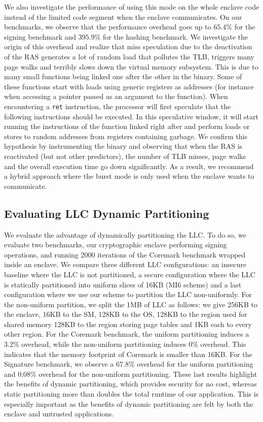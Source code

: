 We also investigate the performance of using this mode on the whole enclave code instead of the limited code segment when the enclave communicates.
On our benchmarks, we observe that the performance overhead goes up to $65.4\%$ for the signing benchmark and $395.9\%$ for the hashing benchmark. 
We investigate the origin of this overhead and realize that miss speculation due to the deactivation of the RAS generates a lot of random load that pollutes the TLB, triggers many page walks and terribly slows down the virtual memory subsystem.
This is due to many small functions being linked one after the other in the binary.
Some of these functions start with loads using generic registers as addresses (for instance when accessing a pointer passed as an argument to the function).
When encountering a \texttt{ret} instruction, the processor will first speculate that the following instructions should be executed.
In this speculative window, it will start running the instructions of the function linked right after and perform loads or stores to random addresses from registers containing garbage.
We confirm this hypothesis by instrumenting the binary and observing that when the RAS is reactivated (but not other predictors), the number of TLB misses, page walks and the overall execution time go down significantly.
As a result, we recommend a hybrid approach where the burst mode is only used when the enclave wants to communicate.

\subsection{Evaluating LLC Dynamic Partitioning}
\label{sec:evalllcpartitioning}

We evaluate the advantage of dynamically partitioning the LLC. To do so, we evaluate two benchmarks, our cryptographic enclave performing signing operations, and running 2000 iterations of the Coremark \cite{gal2012exploring} benchmark wrapped inside an enclave.
We compare three different LLC configurations:
an insecure baseline where the LLC is not partitioned, a secure configuration where the LLC is statically partitioned into uniform slices of 16KB (MI6 scheme) and a last configuration where we use our scheme to partition the LLC non-uniformly.
For the non-uniform partition, we split the 1MB of LLC as follows: we give 256KB to the enclave, 16KB to the SM, 128KB to the OS, 128KB to the region used for shared memory 128KB to the region storing page tables and 1KB each to every other region.
For the Coremark benchmark, the uniform partitioning induces a 3.2\% overhead, while the non-uniform partitioning induces 0\% overhead. 
This indicates that the memory footprint of Coremark is smaller than 16KB.
For the Signature benchmark, we observe a 67.8\% overhead for the uniform partitioning and 0.08\% overhead for the non-uniform partitioning.
These last results highlight the benefits of dynamic partitioning, which provides security for no cost, whereas static partitioning more than doubles the total runtime of our application.
This is especially important as the benefits of dynamic partitioning are felt by both the enclave and untrusted applications.

